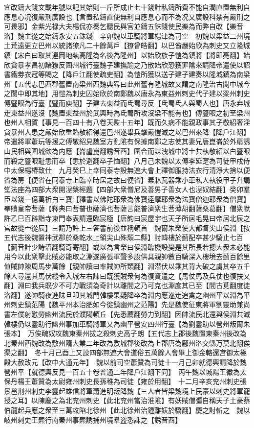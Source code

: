 宜改鑄大錢文載年號以記其始則一斤所成止七十錢計私鑄所費不能自潤直置無利自應息心况復嚴刑廣設也【言置私鑄直使無利自應息心而不為况又廣設科禁有嚴刑之可畏邪】金紫光禄大夫楊侃亦奏乞聽民與官並鑄五銖錢使民樂為而弊自改【樂音洛】魏主從之始鑄永安五銖錢　辛卯魏以車騎將軍楊津為司空　初魏以梁益二州境土荒遠更立巴州以統諸獠凡二十餘萬戶【獠曾皓翻】以巴酋嚴始欣為刺史又立隆城鎮【宋白曰取其連岡地埶高隆為名後為隆州】以始欣族子愷為鎮將【將即亮翻】始欣貪暴孝昌初諸獠反圍州城行臺魏子建撫諭之乃散始欣恐獲罪隂來請降帝遣使以詔書鐵劵衣冠等賜之【降戶江翻使疏吏翻】為愷所獲以送子建子建奏以隆城鎮為南梁州【五代志巴西郡舊置南梁州西魏典畧曰此州舊有隆城故又謂之南隆治古閬中城今之閬中即其地】用愷為刺史囚始欣於南鄭魏以唐永為東益州刺史代子建以梁州刺史傅豎眼為行臺【豎而庾翻】子建去東益而氐蜀尋反【氐蜀氐人與蜀人也】唐永弃城走東益州遂沒【魏置東益州於武興時為氐蜀所攻沒梁不能有也】傳豎眼之初至梁州也州人相賀【事見一百四十有八卷天監十五年】既而久病不能親政事其子敬紹奢淫貪暴州人患之嚴始欣重賂敬紹得還巴州遂舉兵擊嚴愷滅之以巴州來降【降戶江翻】帝遣將軍蕭玩等援之傅敬紹見魏室方亂隂有保據南鄭之志使其妻兄唐崑崙於外扇誘山民相與圍城欲為内應【崙盧崑翻誘音酉】圍合而謀洩城中將士共執敬紹以白豎眼而殺之豎眼耻恚而卒【恚於避翻卒子恤翻】八月己未魏以太傅李延寔為司徒甲戍侍中太保楊椿致仕　九月癸巳上幸同泰寺設無遮大會上釋御服持法衣行清淨大捨以便省為房【便省在同泰寺上臨幸時居之故曰便省】素牀瓦器乘小車私人執役甲子升講堂法座為四部大衆開湼槃經題【四部大衆僧尼及善男子善女人也湼奴結翻】癸卯羣臣以錢一億萬祈白三寶【釋書以佛陀耶衆為佛寶逹摩耶衆為法寶僧迦耶衆為僧寶】奉贖皇帝菩薩【釋典曰菩普也薩濟也菩薩言能普濟衆生菩薄胡翻薩桑葛翻】僧衆默許乙巳百辟詣寺東門奉表請還臨宸極【唐韵曰宸屋宇也天子所居毛晃曰帝居北辰之宫故從宀從辰】三請乃許上三答書前後並稱頓首　魏爾朱榮使大都督尖山侯淵【按五代志後魏置神武郡於桑乾水上領尖山殊頹二縣】討韓樓於薊配卒甚少騎止七百【薊音計少詩沼翻騎奇寄翻】或以為言榮曰侯淵臨機設變是其所長若摠大衆未必能用今以此衆擊此賊必能取之淵遂廣張軍聲多設供具親帥數百騎深入樓境去薊百餘里值賊帥陳周馬步萬餘【親帥讀曰率賊帥所類翻】淵潜伏以乘其背大破之虜其卒五千餘人尋還其馬伏縱令入城左右諫曰既獲賊衆何為復資遣之【馬仗馬及兵仗也復扶又翻】淵曰我兵既少不可力戰須為奇計以離間之乃可克也淵度其已至【間古莧翻度徒洛翻】遂帥騎夜進昧旦叩其城門韓樓果疑降卒為淵内應遂走追禽之幽州平以淵為平州刺史鎮范陽【魏平州本治肥如今徙鎮幽州之范陽】先是魏使征東將軍劉靈助兼尚書左僕射慰勞幽州流民於濮陽頓丘【先悉薦翻勞力到翻】因帥流民北還與侯淵共滅韓樓仍以靈助行幽州事加車騎將軍又為幽平營安四州行臺【為劉靈助以營州叛爾朱張本】　万俟醜奴攻魏東秦州拔之殺刺史高子朗【五代志上郡後魏置東秦州後改為北秦州西魏改為敷州隋大業二年改為敷城郡後改為上郡唐為鄜州洛交縣万莫北翻俟渠之翻】　冬十月己酉上又設四部無遮大會道俗五萬餘人會畢上御金輅還宫御太極殿大赦改元【改中大通元年】　魏以前司空蕭贊為司徒十一月己卯就德興請降於魏營州平【就德興反見一百五十卷普通二年降戶江翻下同】　丙午魏以城陽王徽為太保丹楊王蕭贊為太尉雍州刺史長孫稚為司徒【雍於用翻】　十二月辛亥兖州刺史張景邕荆州刺史李靈起雄信將軍蕭進明叛降魏【三人者皆梁魏境上民豪以刺史將軍寵授之耳】以陳慶之為北兖州刺史【此北兖州當治淮隂】有妖賊僧彊自稱天子土豪蔡伯龍起兵應之衆至三萬攻陷北徐州【此北徐州治鍾離妖於驕翻】慶之討斬之　魏以岐州刺史王羆行南秦州事羆誘捕州境羣盗悉誅之【誘音酉】

